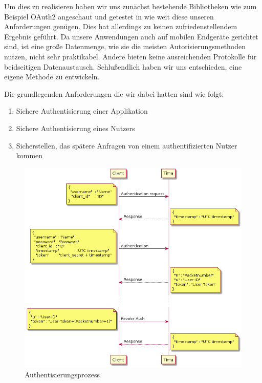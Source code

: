 Um dies zu realisieren haben wir uns zunächst bestehende Bibliotheken wie zum Beispiel OAuth2 angeschaut und getestet in wie weit diese unseren Anforderungen genügen. Dies hat allerdings zu keinen zufriedenstellendem Ergebnis geführt.  Da unsere Anwendungen auch auf mobilen Endgeräte gerichtet sind, ist eine große Datenmenge, wie sie die meisten Autorisierungsmethoden nutzen, nicht sehr praktikabel. Andere bieten keine ausreichenden Protokolle für beidseitigen Datenaustausch. Schlußendlich haben wir uns entschieden, eine eigene Methode zu entwickeln.

Die grundlegenden Anforderungen die wir dabei hatten sind wie folgt:
\begin{enumerate}
	\item Sichere Authentisierung einer Applikation
	\item Sichere Authentisierung eines Nutzers
	\item Sicherstellen, das spätere Anfragen von einem authentifizierten Nutzer kommen
\end{enumerate}

\begin{figure}[!h]
	\centering
	\includegraphics[width=\textwidth]{images/auth.png}
	\caption{Authentisierungsprozess}
	\label{fig:auth}
\end{figure}

